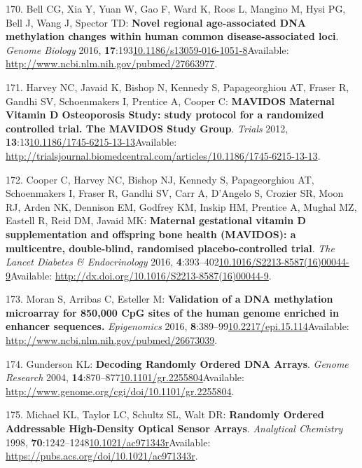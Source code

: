 \documentclass[
]{book}
\begin{document}
\leavevmode\hypertarget{ref-Bell2016}{}%
170. Bell CG, Xia Y, Yuan W, Gao F, Ward K, Roos L, Mangino M, Hysi PG, Bell J, Wang J, Spector TD: \textbf{Novel regional age-associated DNA methylation changes within human common disease-associated loci}. \emph{Genome Biology} 2016, \textbf{17}:193\href{https://doi.org/10.1186/s13059-016-1051-8}{10.1186/s13059-016-1051-8}Available: \url{http://www.ncbi.nlm.nih.gov/pubmed/27663977}.

\leavevmode\hypertarget{ref-Harvey2012a}{}%
171. Harvey NC, Javaid K, Bishop N, Kennedy S, Papageorghiou AT, Fraser R, Gandhi SV, Schoenmakers I, Prentice A, Cooper C: \textbf{MAVIDOS Maternal Vitamin D Osteoporosis Study: study protocol for a randomized controlled trial. The MAVIDOS Study Group}. \emph{Trials} 2012, \textbf{13}:13\href{https://doi.org/10.1186/1745-6215-13-13}{10.1186/1745-6215-13-13}Available: \url{http://trialsjournal.biomedcentral.com/articles/10.1186/1745-6215-13-13}.

\leavevmode\hypertarget{ref-Cooper2016}{}%
172. Cooper C, Harvey NC, Bishop NJ, Kennedy S, Papageorghiou AT, Schoenmakers I, Fraser R, Gandhi SV, Carr A, D'Angelo S, Crozier SR, Moon RJ, Arden NK, Dennison EM, Godfrey KM, Inskip HM, Prentice A, Mughal MZ, Eastell R, Reid DM, Javaid MK: \textbf{Maternal gestational vitamin D supplementation and offspring bone health (MAVIDOS): a multicentre, double-blind, randomised placebo-controlled trial}. \emph{The Lancet Diabetes \& Endocrinology} 2016, \textbf{4}:393--402\href{https://doi.org/10.1016/S2213-8587(16)00044-9}{10.1016/S2213-8587(16)00044-9}Available: \url{http://dx.doi.org/10.1016/S2213-8587(16)00044-9}.

\leavevmode\hypertarget{ref-Moran2015}{}%
173. Moran S, Arribas C, Esteller M: \textbf{Validation of a DNA methylation microarray for 850,000 CpG sites of the human genome enriched in enhancer sequences.} \emph{Epigenomics} 2016, \textbf{8}:389--99\href{https://doi.org/10.2217/epi.15.114}{10.2217/epi.15.114}Available: \url{http://www.ncbi.nlm.nih.gov/pubmed/26673039}.

\leavevmode\hypertarget{ref-Gunderson2004}{}%
174. Gunderson KL: \textbf{Decoding Randomly Ordered DNA Arrays}. \emph{Genome Research} 2004, \textbf{14}:870--877\href{https://doi.org/10.1101/gr.2255804}{10.1101/gr.2255804}Available: \url{http://www.genome.org/cgi/doi/10.1101/gr.2255804}.

\leavevmode\hypertarget{ref-Michael1998}{}%
175. Michael KL, Taylor LC, Schultz SL, Walt DR: \textbf{Randomly Ordered Addressable High-Density Optical Sensor Arrays}. \emph{Analytical Chemistry} 1998, \textbf{70}:1242--1248\href{https://doi.org/10.1021/ac971343r}{10.1021/ac971343r}Available: \url{https://pubs.acs.org/doi/10.1021/ac971343r}.
\end{document}
